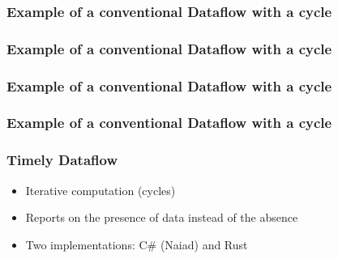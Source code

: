 \documentclass[aspectratio=169,10pt]{beamer}
\begin{document}
\begin{frame}
  \frametitle{Example of a conventional Dataflow with a cycle}
  \begin{center}
    
  \end{center}
\end{frame}

\begin{frame}
  \frametitle{Example of a conventional Dataflow with a cycle}
  \begin{center}
    
  \end{center}
\end{frame}

\begin{frame}
  \frametitle{Example of a conventional Dataflow with a cycle}
  \begin{center}
    
  \end{center}
\end{frame}

\begin{frame}
  \frametitle{Example of a conventional Dataflow with a cycle}
  \begin{center}
    
  \end{center}
\end{frame}

\begin{frame}
  \frametitle{Timely Dataflow}
  \begin{figure}
  \end{figure}
  \pause
  \begin{itemize}
    \item Iterative computation (cycles)
          \pause
    \item Reports on the presence of data instead of the absence
          \pause
    \item Two implementations: C\# (Naiad) and Rust
  \end{itemize}
\end{frame}
\end{document}
